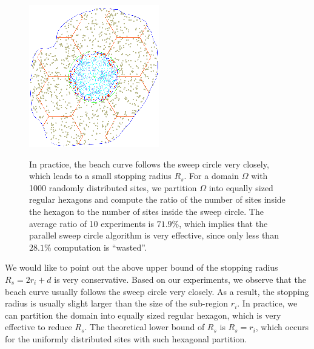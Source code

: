 {{\begin{figure}[!htbp]
\begin{center}
\includegraphics[width=0.9\columnwidth]{figs/sweepcircle/overlap.png}\\
\end{center}
\vspace{-0.1in}\caption{In practice, the beach curve follows the
sweep circle very closely, which leads to a small stopping radius
$R_s$. For a domain $\Omega$ with 1000 randomly distributed sites,
we partition $\Omega$ into equally sized regular hexagons and
compute the ratio of the number of sites inside the hexagon to the
number of sites inside the sweep circle. The average ratio of 10
experiments is $71.9\%$, which implies that the parallel sweep
circle algorithm is very effective, since only less than $28.1\%$
computation is ``wasted''.} \label{fig:overlap}
\vspace{-2mm}
\end{figure}

We would like to point out the above upper bound of the stopping
radius $R_s=2r_i+d$ is very conservative. Based on our experiments,
we observe that the beach curve usually follows the sweep circle
very closely. As a result, the stopping radius is usually slight
larger than the size of the sub-region $r_i$. In practice, we can
partition the domain into equally sized regular hexagon, which is
very effective to reduce $R_s$. The theoretical lower bound of $R_s$
is $R_s=r_i$, which occurs for the uniformly distributed sites with
such hexagonal partition.

}}
